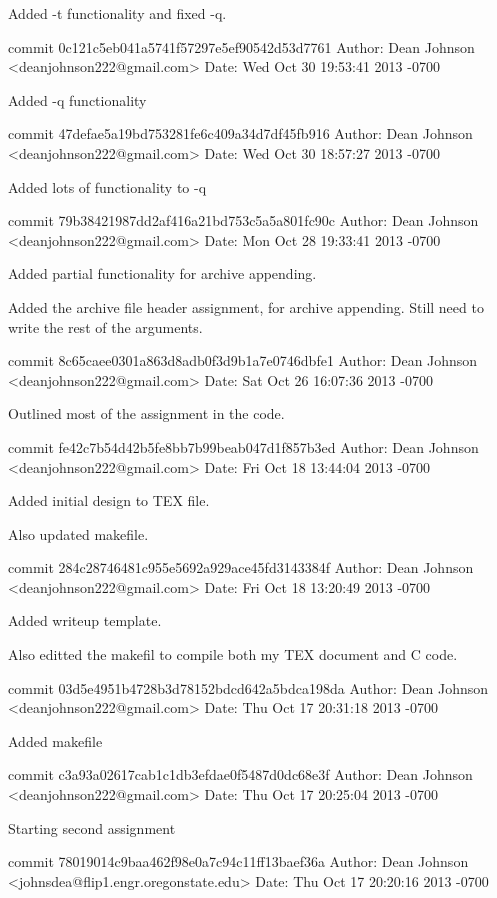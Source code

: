 \documentclass[fleqn,10pt,titlepage]{article}
\begin{document}
    Added -t functionality and fixed -q.

commit 0c121c5eb041a5741f57297e5ef90542d53d7761
Author: Dean Johnson <deanjohnson222@gmail.com>
Date:   Wed Oct 30 19:53:41 2013 -0700

    Added -q functionality

commit 47defae5a19bd753281fe6c409a34d7df45fb916
Author: Dean Johnson <deanjohnson222@gmail.com>
Date:   Wed Oct 30 18:57:27 2013 -0700

    Added lots of functionality to -q

commit 79b38421987dd2af416a21bd753c5a5a801fc90c
Author: Dean Johnson <deanjohnson222@gmail.com>
Date:   Mon Oct 28 19:33:41 2013 -0700

    Added partial functionality for archive appending.
    
    Added the archive file header assignment, for archive appending.
    Still need to write the rest of the arguments.

commit 8c65caee0301a863d8adb0f3d9b1a7e0746dbfe1
Author: Dean Johnson <deanjohnson222@gmail.com>
Date:   Sat Oct 26 16:07:36 2013 -0700

    Outlined most of the assignment in the code.

commit fe42c7b54d42b5fe8bb7b99beab047d1f857b3ed
Author: Dean Johnson <deanjohnson222@gmail.com>
Date:   Fri Oct 18 13:44:04 2013 -0700

    Added initial design to TEX file.
    
    Also updated makefile.

commit 284c28746481c955e5692a929ace45fd3143384f
Author: Dean Johnson <deanjohnson222@gmail.com>
Date:   Fri Oct 18 13:20:49 2013 -0700

    Added writeup template.
    
    Also editted the makefil to compile both my TEX document and C
    code.

commit 03d5e4951b4728b3d78152bdcd642a5bdca198da
Author: Dean Johnson <deanjohnson222@gmail.com>
Date:   Thu Oct 17 20:31:18 2013 -0700

    Added makefile

commit c3a93a02617cab1c1db3efdae0f5487d0dc68e3f
Author: Dean Johnson <deanjohnson222@gmail.com>
Date:   Thu Oct 17 20:25:04 2013 -0700

    Starting second assignment

commit 78019014c9baa462f98e0a7c94c11ff13baef36a
Author: Dean Johnson <johnsdea@flip1.engr.oregonstate.edu>
Date:   Thu Oct 17 20:20:16 2013 -0700
\end{document}
